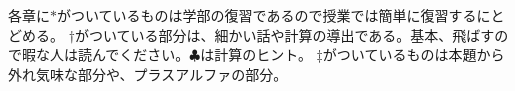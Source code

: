 各章に$\ast$がついているものは学部の復習であるので授業では簡単に復習するにとどめる。
$\dagger$がついている部分は、細かい話や計算の導出である。基本、飛ばすので暇な人は読んでください。$\clubsuit$は計算のヒント。
$\ddagger$がついているものは本題から外れ気味な部分や、プラスアルファの部分。